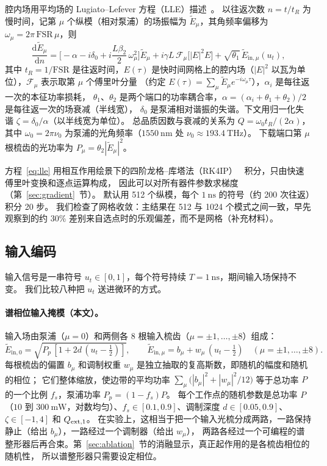 腔内场用平均场的 Lugiato--Lefever 方程（LLE）描述~\cite{lugiato1987,coen2013,chembo2013}。
以往返次数 $n=t/t_R$ 为慢时间，记第 $\mu$ 个纵模（相对泵浦）的场振幅为 $\tilde E_\mu$，其角频率偏移为 $\omega_\mu=2\pi\,\mathrm{FSR}\,\mu$，则
\begin{equation}
\frac{\mathrm d\tilde E_\mu}{\mathrm dn}
=\Big[-\alpha-i\delta_0+i\frac{L\beta_2}{2}\,\omega_\mu^{2}\Big]\tilde E_\mu
+i\gamma L\,\mathcal F_\mu\!\big[|E|^{2}E\big]
+\sqrt{\theta_1}\,\tilde E_{\mathrm{in},\mu}(u_t),
\label{eq:lle}
\end{equation}
其中 $t_R=1/\mathrm{FSR}$ 是往返时间，$E(\tau)$ 是快时间网格上的腔内场（$|E|^2$ 以瓦为单位），$\mathcal F_\mu$ 表示取第 $\mu$ 个傅里叶分量
（约定 $E(\tau)=\sum_\mu\tilde E_\mu e^{-i\omega_\mu\tau}$），$\alpha_i$ 是每往返一次的本征功率损耗，
$\theta_1$、$\theta_2$ 是两个端口的功率耦合率，$\alpha=(\alpha_i+\theta_1+\theta_2)/2$ 是每往返一次的场衰减（半线宽），
$\delta_0$ 是泵浦相对谐振的失谐。下文用归一化失谐 $\zeta=\delta_0/\alpha$（以半线宽为单位）。
总品质因数与衰减的关系为 $Q=\omega_0 t_R/(2\alpha)$，其中 $\omega_0=2\pi\nu_0$ 为泵浦的光角频率（$1550~\mathrm{nm}$ 处 $\nu_0\approx193.4~\mathrm{THz}$）。
下载端口第 $\mu$ 根梳齿的光功率为 $P_\mu=\theta_2|\tilde E_\mu|^{2}$。

方程~\eqref{eq:lle} 用相互作用绘景下的四阶龙格--库塔法（RK4IP）~\cite{hult2007} 积分，只由快速傅里叶变换和逐点运算构成，
因此可以对所有器件参数求梯度（第~\ref{sec:gradient}~节）。
默认用 512 个纵模，每个 $1~\mathrm{ns}$ 的符号（约 200 次往返）积分 20 步。
我们检查了网格收敛：主结果在 512 与 1024 个模式之间一致，早先观察到的约 30\% 差别来自选点时的乐观偏差，而不是网格（补充材料）。

\subsection{输入编码}\label{sec:encodings-def}

输入信号是一串符号 $u_t\in[0,1]$，每个符号持续 $T=1~\mathrm{ns}$，期间输入场保持不变。
我们比较八种把 $u_t$ 送进微环的方式。

\paragraph{谱相位输入掩模（本文）。}
输入场由泵浦（$\mu=0$）和两侧各 8 根输入梳齿（$\mu=\pm1,\dots,\pm8$）组成：
\begin{equation}
\tilde E_{\mathrm{in},0}=\sqrt{P_p\,[1+2d\,(u_t-\tfrac12)]},\qquad
\tilde E_{\mathrm{in},\mu}=b_\mu+w_\mu\,(u_t-\tfrac12)\quad(\mu=\pm1,\dots,\pm8).
\label{eq:mask}
\end{equation}
每根梳齿的偏置 $b_\mu$ 和调制权重 $w_\mu$ 是独立抽取的复高斯数，即随机的幅度和随机的相位；
它们整体缩放，使边带的平均功率 $\sum_\mu\big(|b_\mu|^{2}+|w_\mu|^{2}/12\big)$ 等于总功率 $P$ 的一个比例 $f_s$，泵浦功率 $P_p=(1-f_s)P$。
每个工作点的随机参数是总功率 $P$（$10$ 到 $300~\mathrm{mW}$，对数均匀）、$f_s\in[0.1,0.9]$、调制深度 $d\in[0.05,0.9]$、$\zeta\in[-1,4]$ 和 $Q_{\mathrm{ext},1}$。
在实验上，这相当于把一个输入光梳分成两路，一路保持静止（给出 $b_\mu$），一路经过一个调制器（给出 $w_\mu$），
两路各经过一个可编程的谱整形器后再合束。第~\ref{sec:ablation}~节的消融显示，真正起作用的是各梳齿相位的随机性，
所以谱整形器只需要设定相位。

